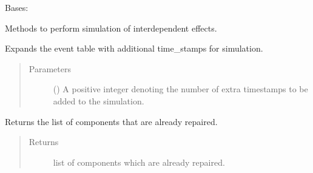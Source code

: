 \documentclass[letterpaper,10pt,english]{sphinxmanual}
\begin{document}
\begin{fulllineitems}
\label{\detokenize{apidoc:dreaminsg_integrated_model.src.simulation.NetworkSimulation}}
\sphinxAtStartPar
Bases: 

\sphinxAtStartPar
Methods to perform simulation of interdependent effects.

\begin{fulllineitems}
\label{\detokenize{apidoc:dreaminsg_integrated_model.src.simulation.NetworkSimulation.expand_event_table}}
\sphinxAtStartPar
Expands the event table with additional time\_stamps for simulation.
\begin{quote}\begin{description}
\item[{Parameters}] \leavevmode
\sphinxAtStartPar
{} () \textendash{} A positive integer denoting the number of extra time\sphinxhyphen{}stamps to be added to the simulation.

\end{description}\end{quote}

\end{fulllineitems}


\begin{fulllineitems}
\label{\detokenize{apidoc:dreaminsg_integrated_model.src.simulation.NetworkSimulation.get_components_repaired}}
\sphinxAtStartPar
Returns the list of components that are already repaired.
\begin{quote}\begin{description}
\item[{Returns}] \leavevmode
\sphinxAtStartPar
list of components which are already repaired.


\end{description}
\end{quote}
\end{fulllineitems}
\end{fulllineitems}
\end{document}
